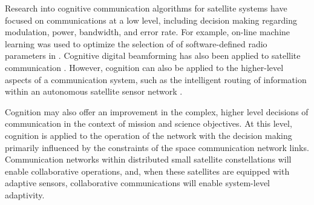 \documentclass[conference]{IEEEtran}
\begin{document}

Research into cognitive communication algorithms for satellite systems have focused on communications at a low level, including decision making regarding modulation, power, bandwidth, and error rate.  For example, on-line machine learning was used to optimize the selection of of software-defined radio parameters in \cite{ref4}.  Cognitive digital beamforming has also been applied to satellite communication \cite{ref5}.  However, cognition can also be applied to the higher-level aspects of a communication system, such as the intelligent routing of information within an autonomous satellite sensor network \cite{ref7}.  

Cognition may also offer an improvement in the complex, higher level decisions of communication in the context of mission and science objectives.  At this level, cognition is applied to the operation of the network with the decision making primarily influenced by the constraints of the space communication network links.  Communication networks within distributed small satellite constellations will enable collaborative operations, and, when these satellites are equipped with adaptive sensors, collaborative communications will enable system-level adaptivity.  
\end{document}
